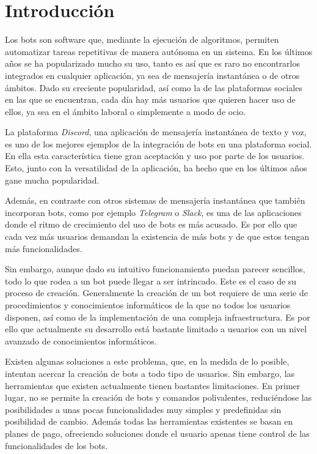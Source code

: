 \chapter{Introducción}

Los bots son software que, mediante la ejecución de algoritmos, permiten automatizar tareas repetitivas de manera autónoma en un sistema. En los últimos años se ha popularizado mucho su uso, tanto es así que es raro no encontrarlos integrados en cualquier aplicación, ya sea de mensajería instantánea o de otros ámbitos. Dado su creciente popularidad, así como la de las plataformas sociales en las que se encuentran, cada día hay más usuarios que quieren hacer uso de ellos, ya sea en el ámbito laboral o simplemente a modo de ocio.

La plataforma \textit{Discord}, una aplicación de mensajería instantánea de texto y voz, es uno de los mejores ejemplos de la integración de bots en una plataforma social. En ella esta característica tiene gran aceptación y uso por parte de los usuarios. Esto, junto con la versatilidad de la aplicación, ha hecho que en los últimos años gane mucha popularidad\cite{tsbb}. 

Además, en contraste con otros sistemas de mensajería instantánea que también incorporan bots, como por ejemplo \textit{Telegram} o \textit{Slack}, es una de las aplicaciones donde el ritmo de crecimiento del uso de bots es más acusado. Es por ello que cada vez más usuarios demandan la existencia de más bots y de que estos tengan más funcionalidades.

Sin embargo, aunque dado su intuitivo funcionamiento puedan parecer sencillos, todo lo que rodea a un bot puede llegar a ser intrincado. Este es el caso de su proceso de creación. Generalmente la creación de un bot requiere de una serie de procedimientos y conocimientos informáticos de la que no todos los usuarios disponen, así como de la implementación de una compleja infraestructura. Es por ello que actualmente su desarrollo está bastante limitado a usuarios con un nivel avanzado de conocimientos informáticos.

Existen algunas soluciones a este problema, que, en la medida de lo posible, intentan acercar la creación de bots a todo tipo de usuarios. Sin embargo, las herramientas que existen actualmente tienen bastantes limitaciones. En primer lugar, no se permite la creación de bots y comandos polivalentes, reduciéndose las posibilidades a unas pocas funcionalidades muy simples y predefinidas sin posibilidad de cambio. Además todas las herramientas existentes se basan en planes de pago, ofreciendo soluciones donde el usuario apenas tiene control de las funcionalidades de los bots.

